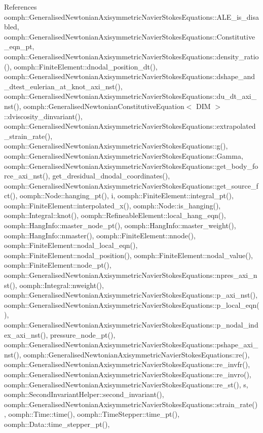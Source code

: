 References oomph\+::\+Generalised\+Newtonian\+Axisymmetric\+Navier\+Stokes\+Equations\+::\+A\+L\+E\+\_\+is\+\_\+disabled, oomph\+::\+Generalised\+Newtonian\+Axisymmetric\+Navier\+Stokes\+Equations\+::\+Constitutive\+\_\+eqn\+\_\+pt, oomph\+::\+Generalised\+Newtonian\+Axisymmetric\+Navier\+Stokes\+Equations\+::density\+\_\+ratio(), oomph\+::\+Finite\+Element\+::dnodal\+\_\+position\+\_\+dt(), oomph\+::\+Generalised\+Newtonian\+Axisymmetric\+Navier\+Stokes\+Equations\+::dshape\+\_\+and\+\_\+dtest\+\_\+eulerian\+\_\+at\+\_\+knot\+\_\+axi\+\_\+nst(), oomph\+::\+Generalised\+Newtonian\+Axisymmetric\+Navier\+Stokes\+Equations\+::du\+\_\+dt\+\_\+axi\+\_\+nst(), oomph\+::\+Generalised\+Newtonian\+Constitutive\+Equation$<$ D\+I\+M $>$\+::dviscosity\+\_\+dinvariant(), oomph\+::\+Generalised\+Newtonian\+Axisymmetric\+Navier\+Stokes\+Equations\+::extrapolated\+\_\+strain\+\_\+rate(), oomph\+::\+Generalised\+Newtonian\+Axisymmetric\+Navier\+Stokes\+Equations\+::g(), oomph\+::\+Generalised\+Newtonian\+Axisymmetric\+Navier\+Stokes\+Equations\+::\+Gamma, oomph\+::\+Generalised\+Newtonian\+Axisymmetric\+Navier\+Stokes\+Equations\+::get\+\_\+body\+\_\+force\+\_\+axi\+\_\+nst(), get\+\_\+dresidual\+\_\+dnodal\+\_\+coordinates(), oomph\+::\+Generalised\+Newtonian\+Axisymmetric\+Navier\+Stokes\+Equations\+::get\+\_\+source\+\_\+fct(), oomph\+::\+Node\+::hanging\+\_\+pt(), i, oomph\+::\+Finite\+Element\+::integral\+\_\+pt(), oomph\+::\+Finite\+Element\+::interpolated\+\_\+x(), oomph\+::\+Node\+::is\+\_\+hanging(), oomph\+::\+Integral\+::knot(), oomph\+::\+Refineable\+Element\+::local\+\_\+hang\+\_\+eqn(), oomph\+::\+Hang\+Info\+::master\+\_\+node\+\_\+pt(), oomph\+::\+Hang\+Info\+::master\+\_\+weight(), oomph\+::\+Hang\+Info\+::nmaster(), oomph\+::\+Finite\+Element\+::nnode(), oomph\+::\+Finite\+Element\+::nodal\+\_\+local\+\_\+eqn(), oomph\+::\+Finite\+Element\+::nodal\+\_\+position(), oomph\+::\+Finite\+Element\+::nodal\+\_\+value(), oomph\+::\+Finite\+Element\+::node\+\_\+pt(), oomph\+::\+Generalised\+Newtonian\+Axisymmetric\+Navier\+Stokes\+Equations\+::npres\+\_\+axi\+\_\+nst(), oomph\+::\+Integral\+::nweight(), oomph\+::\+Generalised\+Newtonian\+Axisymmetric\+Navier\+Stokes\+Equations\+::p\+\_\+axi\+\_\+nst(), oomph\+::\+Generalised\+Newtonian\+Axisymmetric\+Navier\+Stokes\+Equations\+::p\+\_\+local\+\_\+eqn(), oomph\+::\+Generalised\+Newtonian\+Axisymmetric\+Navier\+Stokes\+Equations\+::p\+\_\+nodal\+\_\+index\+\_\+axi\+\_\+nst(), pressure\+\_\+node\+\_\+pt(), oomph\+::\+Generalised\+Newtonian\+Axisymmetric\+Navier\+Stokes\+Equations\+::pshape\+\_\+axi\+\_\+nst(), oomph\+::\+Generalised\+Newtonian\+Axisymmetric\+Navier\+Stokes\+Equations\+::re(), oomph\+::\+Generalised\+Newtonian\+Axisymmetric\+Navier\+Stokes\+Equations\+::re\+\_\+invfr(), oomph\+::\+Generalised\+Newtonian\+Axisymmetric\+Navier\+Stokes\+Equations\+::re\+\_\+invro(), oomph\+::\+Generalised\+Newtonian\+Axisymmetric\+Navier\+Stokes\+Equations\+::re\+\_\+st(), s, oomph\+::\+Second\+Invariant\+Helper\+::second\+\_\+invariant(), oomph\+::\+Generalised\+Newtonian\+Axisymmetric\+Navier\+Stokes\+Equations\+::strain\+\_\+rate(), oomph\+::\+Time\+::time(), oomph\+::\+Time\+Stepper\+::time\+\_\+pt(), oomph\+::\+Data\+::time\+\_\+stepper\+\_\+pt(), 